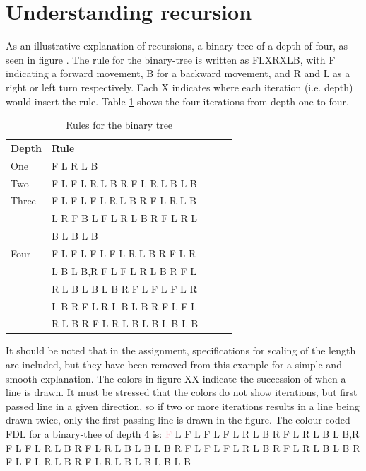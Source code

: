 \documentclass[titlepage]{article}
\newcommand{\pink}{\textcolor{pink}}
\begin{document}
\section{Understanding recursion}
As an illustrative explanation of recursions, a binary-tree of a depth of four, as seen in figure  . The rule for the binary-tree is written as FLXRXLB, with F indicating a forward movement, B for a backward movement, and R and L as a right or left turn respectively. Each X indicates where each iteration (i.e. depth) would insert the rule. Table \ref{table:binary}  shows the four iterations from depth one to four. 
\begin{table}[H]
\centering
\caption{Rules for the binary tree}
\label{table:binary}
\begin{tabular}{lllll}
  \textbf{Depth} & \textbf{Rule}\\
  One   & F L R L B \\
  Two   & F L F L R L B R F L R L B L B\\
  Three &F L F L F L R L B R F L R L B \\
        & L R F B L F L R L B R F L R L  \\
  &B L B L B\\
  Four  & F L F L F L F L R L B R F L R\\
   & L B L B,R F L F L R L B R F L\\
   & R L B L B L B R F L F L F L R\\
   & L B R F L R L B L B R F L F L\\
   & R L B R F L R L B L B L B L B\\
  \end{tabular}
\end{table}
It should be noted that in the assignment, specifications for scaling of the length are included, but they have been removed from this example for a simple and smooth explanation. The colors in figure XX indicate the succession of when a line is drawn. It must be stressed that the colors do not show iterations, but first passed line in a given direction, so if two or more iterations results in a line being drawn twice, only the first passing line is drawn in the figure. The colour coded FDL for a binary-thee of depth 4 is:
\pink{F} L F L F L F L R L B R F L R L B L B,R F L F L R L B R F L R L B L B L B R F L F L F L R L B R F L R L B L B R F L F L R L B R F L R L B L B L B L B
\end{document}
